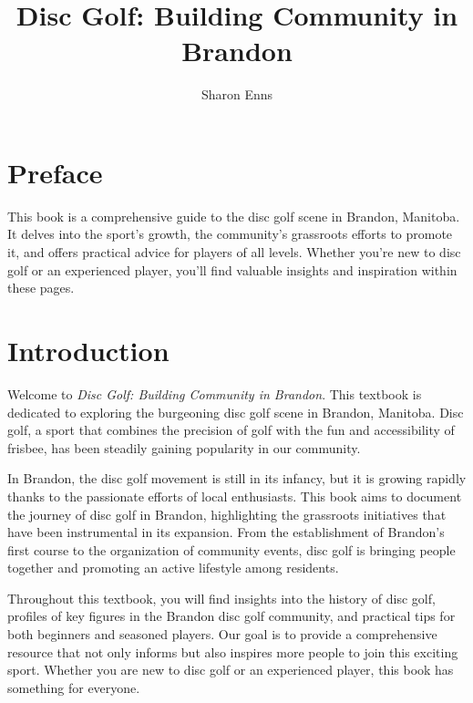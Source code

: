 \documentclass[
  openany]{book}
\title{Disc Golf: Building Community in Brandon}
\author{Sharon Enns}
\date{}
\begin{document}
\maketitle

{
\setcounter{tocdepth}{1}
\tableofcontents
}
\chapter{Preface}\label{preface}

This book is a comprehensive guide to the disc golf scene in Brandon, Manitoba. It delves into the sport's growth, the community's grassroots efforts to promote it, and offers practical advice for players of all levels. Whether you're new to disc golf or an experienced player, you'll find valuable insights and inspiration within these pages.

\chapter{Introduction}\label{introduction}

Welcome to \emph{Disc Golf: Building Community in Brandon}. This textbook is dedicated to exploring the burgeoning disc golf scene in Brandon, Manitoba. Disc golf, a sport that combines the precision of golf with the fun and accessibility of frisbee, has been steadily gaining popularity in our community.

In Brandon, the disc golf movement is still in its infancy, but it is growing rapidly thanks to the passionate efforts of local enthusiasts. This book aims to document the journey of disc golf in Brandon, highlighting the grassroots initiatives that have been instrumental in its expansion. From the establishment of Brandon's first course to the organization of community events, disc golf is bringing people together and promoting an active lifestyle among residents.

Throughout this textbook, you will find insights into the history of disc golf, profiles of key figures in the Brandon disc golf community, and practical tips for both beginners and seasoned players. Our goal is to provide a comprehensive resource that not only informs but also inspires more people to join this exciting sport. Whether you are new to disc golf or an experienced player, this book has something for everyone.
\end{document}
